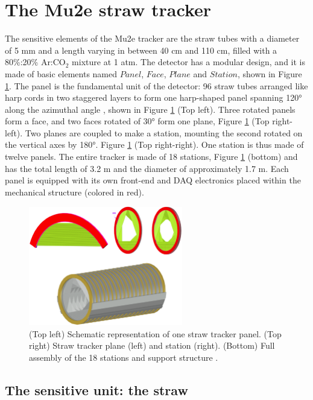 \section{The Mu2e straw tracker}\label{geomtra}
The sensitive elements of the Mu2e tracker are the straw tubes
with a diameter of 5 mm and a length varying in between 40 cm and 110 cm, 
filled with a 80\%:20\% Ar:CO$_2$ mixture at 1 atm.  
The detector has a modular design, and it is made of basic elements named $Panel$, $Face$, 
$Plane$ and $Station$, shown in Figure \ref{fig:trkpanel}. 
The panel is the fundamental unit of the detector: 96 straw tubes arranged like 
harp cords in two staggered layers to form one harp-shaped panel spanning 120° along the azimuthal angle \cite{bartoszek2015mu2e}, 
shown in Figure \ref{fig:trkpanel} (Top left).
Three rotated panels form a face, and two faces rotated of 30° form one plane, Figure \ref{fig:trkpanel} (Top right-left). 
Two planes are coupled to make a station, mounting the second rotated on the vertical axes by 180°.
Figure \ref{fig:trkpanel} (Top right-right).
One station is thus made of twelve panels. The entire tracker is made of 18 stations, Figure \ref{fig:trkpanel} (bottom) 
and has the total length of 3.2 m and the diameter of approximately 1.7 m.
Each panel is equipped with its own front-end and DAQ electronics placed within the mechanical structure (colored in red).
\begin{figure}[!h]
\centering
\includegraphics[width =0.6\textwidth]{figures/png/Screenshot_20240306_222803.png}
\caption[The straw tracker components.]{(Top left) Schematic representation of one straw tracker panel. (Top right) 
Straw tracker plane (left) and station (right). (Bottom) Full assembly of the 18 
stations and support structure \cite{bartoszek2015mu2e}.}
\label{fig:trkpanel}
\end{figure}
\subsection{The sensitive unit: the straw}

